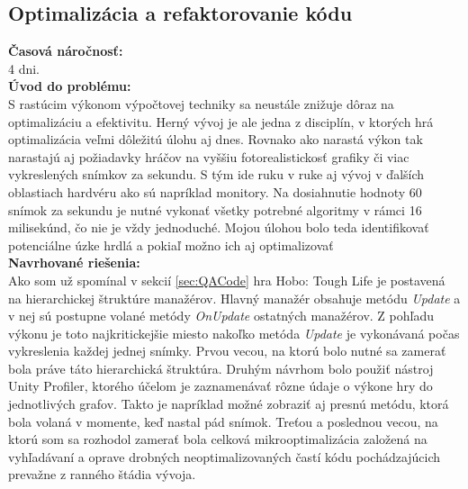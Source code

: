 \documentclass[slovak, bachelorpractice]{diploma}
\begin{document}
\subsection{Optimalizácia a refaktorovanie kódu}
\label{sec:optim}
\textbf{Časová náročnosť:} \\ 4 dni.\\
\textbf{Úvod do problému:} \\ S rastúcim výkonom výpočtovej techniky sa neustále znižuje dôraz na optimalizáciu a efektivitu. Herný vývoj je ale jedna z disciplín, v ktorých hrá optimalizácia veľmi dôležitú úlohu aj dnes. Rovnako ako narastá výkon tak narastajú aj požiadavky hráčov na vyššiu fotorealistickosť grafiky či viac vykreslených snímkov za sekundu. S tým ide ruku v ruke aj vývoj v ďalších oblastiach hardvéru ako sú napríklad monitory. Na dosiahnutie hodnoty 60 snímok za sekundu je nutné vykonať všetky potrebné algoritmy v rámci 16 milisekúnd, čo nie je vždy jednoduché. Mojou úlohou bolo teda identifikovať potenciálne úzke hrdlá a pokiaľ možno ich aj optimalizovať \\
\textbf{Navrhované riešenia:} \\ Ako som už spomínal v sekcií \ref{sec:QACode} hra Hobo: Tough Life je postavená na hierarchickej štruktúre manažérov. Hlavný manažér obsahuje metódu \textit{Update} a v nej sú postupne volané metódy \textit{OnUpdate} ostatných manažérov. Z pohľadu výkonu je toto najkritickejšie miesto nakoľko metóda \textit{Update} je vykonávaná počas vykreslenia každej jednej snímky. Prvou vecou, na ktorú bolo nutné sa zamerať bola práve táto hierarchická štruktúra. Druhým návrhom bolo použiť nástroj Unity Profiler, ktorého účelom je zaznamenávať rôzne údaje o výkone hry do jednotlivých grafov. Takto je napríklad možné zobraziť aj presnú metódu, ktorá bola volaná v momente, keď nastal pád snímok. Treťou a poslednou vecou, na ktorú som sa rozhodol zamerať bola celková mikrooptimalizácia založená na vyhľadávaní a oprave drobných neoptimalizovaných častí kódu pochádzajúcich prevažne z ranného štádia vývoja.  \\
\end{document}
